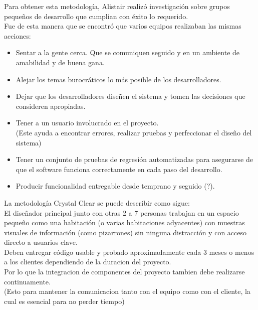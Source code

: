\documentclass[12pt,a4paper]{article}
\begin{document}
	Para obtener esta metodolog\'ia, Alistair realiz\'o investigaci\'on sobre grupos peque\~nos de desarrollo que cumplian con \'exito lo requerido.\\
	Fue de esta manera que se encontr\'o que varios equipos realizaban las mismas acciones:	
	\begin{itemize}
	\item Sentar a la gente cerca. Que se comuniquen seguido y en un ambiente de amabilidad y de buena gana.
	
	\item Alejar los temas burocr\'aticos lo m\'as posible de los desarrolladores.
	
 	\item Dejar que los desarrolladores dise\~nen el sistema y tomen las decisiones que consideren apropiadas.
	
	\item Tener a un usuario involucrado en el proyecto.\\
	(Este ayuda a encontrar errores, realizar pruebas y perfeccionar el dise\~no del sistema)
	
	\item Tener un conjunto de pruebas de regresi\'on automatizadas para asegurarse de que el software funciona correctamente en cada paso del desarrollo.
	
	\item Producir funcionalidad entregable desde temprano y seguido (?).
	\\
	\end{itemize}
	
	La metodolog\'ia Crystal Clear se puede describir como sigue:\\
	
	El dise\~nador principal junto con otras 2 a 7 personas trabajan en un espacio peque\~no como una habitaci\'on (o varias habitaciones adyacentes) con muestras visuales de informaci\'on (como pizarrones) sin ninguna distracci\'on y con acceso directo a usuarios clave.\\
	
	Deben entregar c\'odigo usable y probado aproximadamente cada 3 meses o menos a los clientes dependiendo de la duracion del proyecto.\\
	Por lo que la integracion de componentes del proyecto tambien debe realizarse continuamente.\\
	(Esto para mantener la comunicacion tanto con el equipo como con el cliente, la cual es esencial para no perder tiempo)\\
	
\end{document}
